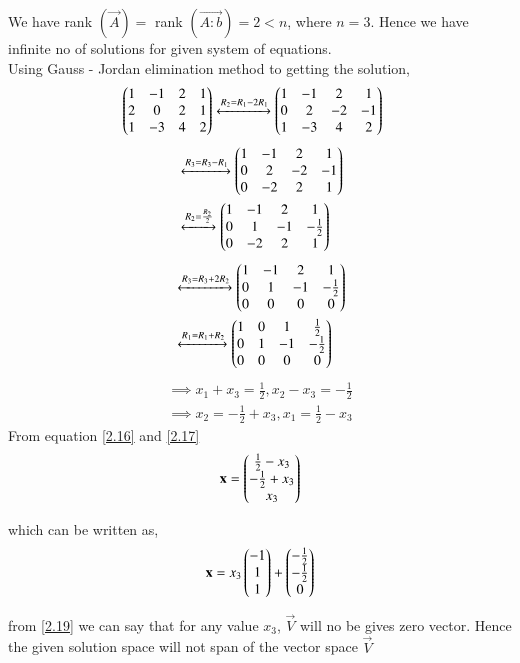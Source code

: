 \documentclass[journal,12pt,twocolumn]{IEEEtran}
\begin{document}
We have rank $\left( \vec{A} \right) = $  rank $\left( \vec{A:b}\right) = 2 < n $, where $n = 3. $ Hence we have infinite no of solutions for given system of equations.\\
Using Gauss - Jordan elimination method to getting the solution,
\begin{align}
\begin{pmatrix}1&-1& 2 & 1 \\ 2& 0 & 2 & 1 \\ 1 & -3 & 4 & 2 \end{pmatrix} &\xleftrightarrow{R_2=R_1 - 2R_1}\begin{pmatrix}1&-1&2 & 1  \\ 0 &2 & -2 & -1 \\ 1 &-3 & 4 & 2\end{pmatrix}
\end{align}
\begin{align}
&\xleftrightarrow{R_3=R_3 -R_1}\begin{pmatrix}1 &-1&2 & 1\\0 &2 &-2 &-1 \\ 0 & -2 & 2 & 1\end{pmatrix} \\
&\xleftrightarrow{R_2= \frac{R_2}{2}}\begin{pmatrix}1 &-1&2 & 1 \\ 0 & 1 & -1 & -\frac{1}{2} \\ 0 & -2 & 2 & 1\end{pmatrix} 
\end{align}
\begin{align}
&\xleftrightarrow{R_3 = R_3 +2R_2}\begin{pmatrix}1 &-1&2 & 1 \\ 0 & 1 & -1 & -\frac{1}{2} \\ 0 & 0 & 0 & 0\end{pmatrix} \\ 
&\xleftrightarrow {R_1 = R_1 + R_2}\begin{pmatrix}1 & 0 & 1 & \frac{1}{2} \\ 0 & 1 & -1 & -\frac{1}{2} \\ 0 & 0 & 0 & 0\end{pmatrix}
\end{align}
\begin{align}
\implies x_1 +x_3 = \frac{1}{2}, x_2 - x_3 = - \frac{1}{2} \label{2.16}\\
\implies x_2 = - \frac{1}{2} +x_3 , x_1 = \frac{1}{2} - x_3 \label{2.17}
\end{align}
From  equation \eqref{2.16} and \eqref{2.17}
\begin{align}
\mathbf{x} = \begin{pmatrix}\frac{1}{2} - x_3 \\ -\frac{1}{2} + x_3 \\ x_3 \end{pmatrix}
\end{align}

which can be written as,
\begin{align}
\mathbf{x}=x_3\begin{pmatrix}-1 \\1\\1\end{pmatrix} + \begin{pmatrix}-\frac{1}{2} \\ -\frac{1}{2}\\ 0\end{pmatrix} \label{2.19}
\end{align}

from \ref{2.19} we can say that for any value $x_3$, $\vec{V}$ will no be gives zero vector. Hence the given solution space will not span of  the vector space $\vec{V}$
\end{document}
